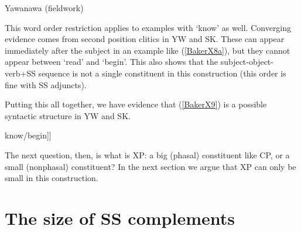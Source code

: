 \documentclass[output=paper]{langscibook}
\begin{document}
\begin{exe}
\ex Yawanawa (fieldwork) \label{BakerX8}
    \begin{xlist}
    \end{xlist}
\end{exe}

This word order restriction applies to examples with ‘know’ as well. Converging evidence comes from second position clitics in YW and SK. These can appear immediately after the subject in an example like (\ref{BakerX8a}), but they cannot appear between ‘read’ and ‘begin’. This also shows that the subject-object-verb+SS sequence is not a single constituent in this construction (this order is fine with SS adjuncts).

Putting this all together, we have evidence that (\ref{BakerX9}) is a possible syntactic structure in YW and SK.

\begin{exe}
    \ex \label{BakerX9} \normalfont[\textsubscript{TP }Shukuvena.\textsc{erg} [\textsubscript{VP }[\textsubscript{XP } PRO/t fish cook-\textsc{SS}] know/begin]]
\end{exe}

The next question, then, is what is XP: a big (phasal) constituent like CP, or a small (nonphasal) constituent? In the next section we argue that XP can only be small in this construction.

\section{The size of SS complements}\label{sec:baker:3}
\end{document}
